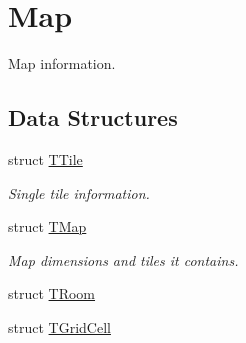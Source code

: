 \hypertarget{group__Game}{}\section{Map}
\label{group__Game}


Map information.  


\subsection*{Data Structures}
\begin{DoxyCompactItemize}
\item 
struct \mbox{\hyperlink{structTTile}{T\+Tile}}
\begin{DoxyCompactList}\small\item\em Single tile information. \end{DoxyCompactList}\item 
struct \mbox{\hyperlink{structTMap}{T\+Map}}
\begin{DoxyCompactList}\small\item\em Map dimensions and tiles it contains. \end{DoxyCompactList}\item 
struct \mbox{\hyperlink{structTRoom}{T\+Room}}
\item 
struct \mbox{\hyperlink{structTGridCell}{T\+Grid\+Cell}}
\end{DoxyCompactItemize}
